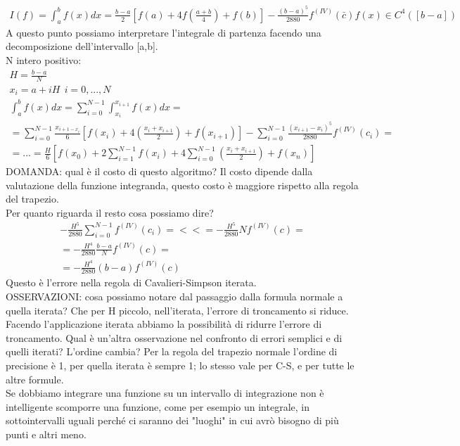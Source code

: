\documentclass[a4paper, portrait]{book}
\numberwithin{equation}{chapter} %
\begin{document}
\begin{gather}
    I(f) = \int_a^b f(x) dx = \frac{b-a}{2}\left[f(a) + 4 f\left(\frac{a+b}{4}\right)+f(b)\right] - \frac{(b-a)^5}{2880} f^{(IV)}(\bar{c})
    f(x) \in C^4([b-a])
\end{gather}
A questo punto possiamo interpretare l'integrale di partenza facendo una decomposizione dell'intervallo [a,b].\\
N intero positivo:
\begin{gather}
    H = \frac{b-a}{N}\\
    x_i = a + iH \ \ i = 0,...,N\\
    \int_a^b f(x) dx = \sum_{i = 0}^{N-1} \int_{x_i}^{x_{i+1}}f(x) dx =\\
    = \sum_{i=0}^{N-1} \frac{x_{i+1-x_i}}{6}\left[f(x_i)+4\left(\frac{x_i + x_{i+1}}{2}\right)+ f(x_{i+1})\right] - \sum_{i=0}^{N-1}\frac{(x_{i+1}-x_i)^5}{2880} f^{(IV)}(c_i) = \\
    = ... = \frac{H}{6}\left[f(x_0) + 2 \sum_{i=1}^{N-1}f(x_i) + 4 \sum_{i=0}^{N-1}\left(\frac{x_i+x_{i+1}}{2}\right) + f(x_n)\right]
\end{gather}
DOMANDA: qual è il costo di questo algoritmo? Il costo dipende dalla valutazione della funzione integranda, questo costo è maggiore rispetto alla regola del trapezio.\\
Per quanto riguarda il resto cosa possiamo dire?
\begin{gather}
    -\frac{H^5}{2880} \sum_{i=0}^{N-1} f^{(IV)}(c_i) = <<
    = -\frac{H^5}{2880} N f^{(IV)}(c) = \\
    = -\frac{H^4}{2880} \frac{b-a}{N} f^{(IV)}(c) = \\
    = -\frac{H^4}{2880} (b-a) f^{(IV)}(c)
\end{gather}
Questo è l'errore nella regola di Cavalieri-Simpson iterata.\\
OSSERVAZIONI: cosa possiamo notare dal passaggio dalla formula normale a quella iterata? Che per H piccolo, nell'iterata, l'errore di troncamento si riduce.\\
Facendo l'applicazione iterata abbiamo la possibilità di ridurre l'errore di troncamento. Qual è un'altra osservazione nel confronto di errori semplici e di quelli iterati? L'ordine cambia? Per la regola del trapezio normale l'ordine di precisione è 1, per quella iterata è sempre 1; lo stesso vale per C-S, e per tutte le altre formule.\\
Se dobbiamo integrare una funzione su un intervallo di integrazione non è intelligente scomporre una funzione, come per esempio un integrale, in sottointervalli uguali perché ci saranno dei "luoghi" in cui avrò bisogno di più punti e altri meno.\\
\end{document}
